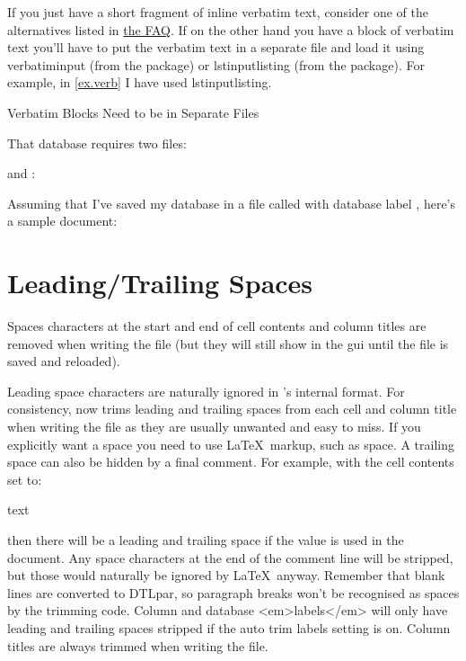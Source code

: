 If you just have a short fragment of inline verbatim text, consider
one of the alternatives listed in \href{https://texfaq.org/FAQ-verbwithin}{the FAQ}.
If on the other hand you have a block of verbatim text you'll have 
to put the verbatim text in a separate file
and load it using \gls{verbatiminput} (from the 
 package) or \gls{lstinputlisting} (from the
 package). For example, in \autoref{ex.verb} 
I have used \gls{lstinputlisting}.

{%
}
{Verbatim Blocks Need to be in Separate Files}

That database requires two files: 

and :


Assuming that I've saved my database in a file called
 with database label ,
here's a sample document:



\section{Leading/Trailing Spaces}\label{spaces}

Spaces characters at the start and end of cell contents and column titles 
are removed when writing the  file (but they will still show
in the \gls{gui} until the file is saved and reloaded).

Leading space characters are naturally ignored in 's 
internal format. For consistency,  now trims leading and trailing 
spaces from each cell and column title when writing the  
file as they are usually unwanted and easy to miss. If you explicitly want
a space you need to use \LaTeX\ markup, such as \gls{space}. 
A trailing space can also be hidden by a final comment. For
example, with the cell contents set to:
\begin{codebox}
 text 
\end{codebox}
then there will be a leading and trailing space if the value is used in the 
document. Any space characters at the end of the comment line will be 
stripped, but those would naturally be ignored by \LaTeX\ anyway.
Remember that blank lines are converted to \gls{DTLpar}, 
so paragraph breaks won't be recognised as spaces by the trimming code.
Column and database <em>labels</em> will only have leading and
trailing spaces stripped if the auto trim labels setting is on.
Column titles are always trimmed when writing the  file.

